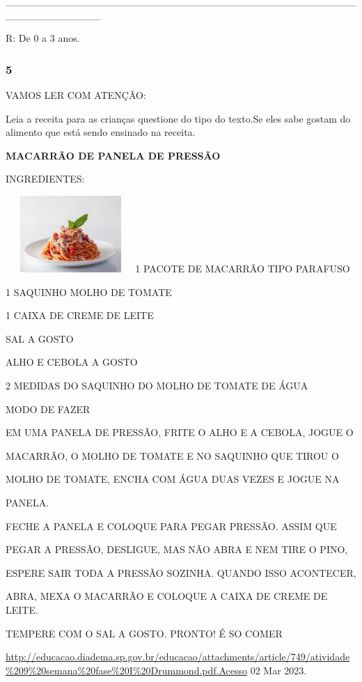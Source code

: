 \_\_\_\_\_\_\_\_\_\_\_\_\_\_\_\_\_\_\_\_\_\_\_\_\_\_\_\_\_\_\_\_\_\_\_\_\_\_\_\_\_\_\_\_\_\_\_\_\_\_\_\_\_\_\_\_\_\_\_\_\_

R: De 0 a 3 anos.

\subsubsection{5}\label{section-33}

VAMOS LER COM ATENÇÃO:

Leia a receita para as crianças questione do tipo do texto.Se eles sabe
gostam do alimento que está sendo ensinado na receita.

\textbf{MACARRÃO DE PANELA DE PRESSÃO}

INGREDIENTES:

\includegraphics[width=1.94097in,height=1.14722in]{media/image84.jpeg}1
PACOTE DE MACARRÃO TIPO PARAFUSO

1 SAQUINHO MOLHO DE TOMATE

1 CAIXA DE CREME DE LEITE

SAL A GOSTO

ALHO E CEBOLA A GOSTO

2 MEDIDAS DO SAQUINHO DO MOLHO DE TOMATE DE ÁGUA

MODO DE FAZER

EM UMA PANELA DE PRESSÃO, FRITE O ALHO E A CEBOLA, JOGUE O

MACARRÃO, O MOLHO DE TOMATE E NO SAQUINHO QUE TIROU O

MOLHO DE TOMATE, ENCHA COM ÁGUA DUAS VEZES E JOGUE NA

PANELA.

FECHE A PANELA E COLOQUE PARA PEGAR PRESSÃO. ASSIM QUE

PEGAR A PRESSÃO, DESLIGUE, MAS NÃO ABRA E NEM TIRE O PINO,

ESPERE SAIR TODA A PRESSÃO SOZINHA. QUANDO ISSO ACONTECER,

ABRA, MEXA O MACARRÃO E COLOQUE A CAIXA DE CREME DE LEITE.

TEMPERE COM O SAL A GOSTO. PRONTO! É SO COMER

\url{http://educacao.diadema.sp.gov.br/educacao/attachments/article/749/atividade\%209\%20semana\%20fase\%20I\%20Drummond.pdf.Acesso}
02 Mar 2023.

